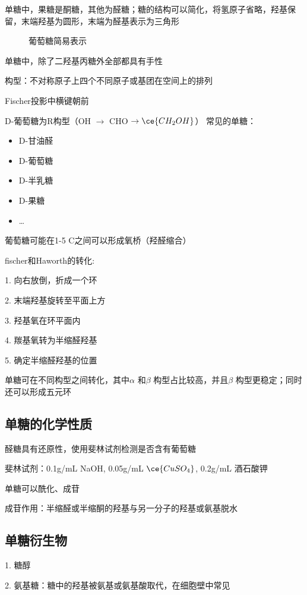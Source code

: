 单糖中，果糖是酮糖，其他为醛糖；糖的结构可以简化，将氢原子省略，羟基保留，末端羟基为圆形，末端为醛基表示为三角形
\begin{figure}[ht!]
    \centering
    \caption{葡萄糖简易表示}
    \label{fig:葡萄糖简易表示}
\end{figure}
单糖中，除了二羟基丙糖外全部都具有手性
\begin{defi}
    构型：不对称原子上四个不同原子或基团在空间上的排列
\end{defi}
\begin{notation}
    Fischer投影中横键朝前
\end{notation}
D-葡萄糖为R构型（OH  $\to $ CHO $\to \ce{CH_2OH}$）
常见的单糖：
\begin{itemize}
    \item D-甘油醛
    \item D-葡萄糖
    \item D-半乳糖
    \item D-果糖
    \item \ldots 
\end{itemize}
\begin{notation}
    葡萄糖可能在1-5 C之间可以形成氧桥（羟醛缩合）
\end{notation}
\begin{notation}
    fischer和Haworth的转化:

    1. 向右放倒，折成一个环

    2. 末端羟基旋转至平面上方

    3. 羟基氧在环平面内

    4. 羰基氧转为半缩醛羟基

    5. 确定半缩醛羟基的位置
\end{notation}
单糖可在不同构型之间转化，其中$\alpha$ 和$\beta$ 构型占比较高，并且$\beta$ 构型更稳定；同时还可以形成五元环
\subsection{单糖的化学性质}%
\label{sub:单糖的化学性质}
醛糖具有还原性，使用斐林试剂检测是否含有葡萄糖
\begin{notation}
    斐林试剂：0.1g/mL NaOH, 0.05g/mL $\ce{CuSO_4}$, 0.2g/mL 酒石酸钾
\end{notation}
\begin{notation}
    单糖可以酰化、成苷
\end{notation}
成苷作用：半缩醛或半缩酮的羟基与另一分子的羟基或氨基脱水
\subsection{单糖衍生物}%
\label{sub:单糖衍生物}
1. 糖醇

2. 氨基糖：糖中的羟基被氨基或氨基酸取代，在细胞壁中常见

